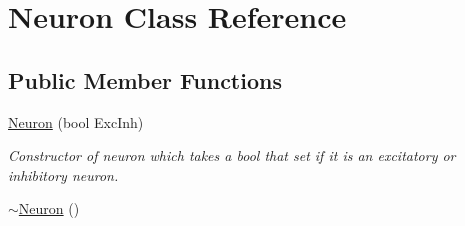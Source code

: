 \hypertarget{classNeuron}{\section{Neuron Class Reference}
\label{classNeuron}
}
\subsection*{Public Member Functions}
\begin{DoxyCompactItemize}
\item 
\hyperlink{classNeuron_ab9fa5be225c196284c9f742b25f9fcaa}{Neuron} (bool Exc\-Inh)
\begin{DoxyCompactList}\small\item\em Constructor of neuron which takes a bool that set if it is an excitatory or inhibitory neuron. \end{DoxyCompactList}\item 
\hypertarget{classNeuron_a94a250ce7e167760e593979b899745b1}{\hyperlink{classNeuron_a94a250ce7e167760e593979b899745b1}{$\sim$\-Neuron} ()}\label{classNeuron_a94a250ce7e167760e593979b899745b1}


\end{DoxyCompactItemize}
